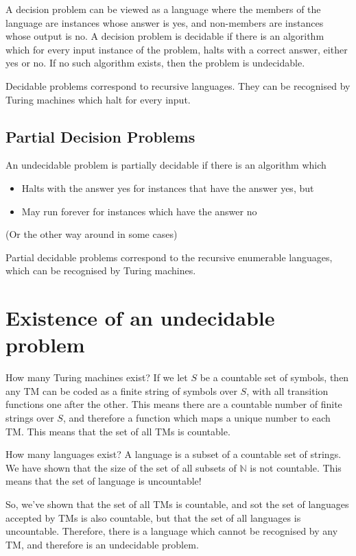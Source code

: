 A decision problem can be viewed as a language where the members of the language are instances whose answer is yes, and
 non-members are instances whose output is no. A decision problem is decidable if there is an algorithm which for every
 input instance of the problem, halts with a correct answer, either yes or no. If no such algorithm exists, then the
 problem is undecidable.

Decidable problems correspond to recursive languages. They can be recognised by Turing machines which halt for every
 input.

\subsection*{Partial Decision Problems}

\begin{definition*}{}{}
  An undecidable problem is partially decidable if there is an algorithm which
  \begin{itemize}
    \item Halts with the answer yes for instances that have the answer yes, but
    \item May run forever for instances which have the answer no
  \end{itemize}
  (Or the other way around in some cases)
\end{definition*}

Partial decidable problems correspond to the recursive enumerable languages, which can be recognised by Turing machines.

\section*{Existence of an undecidable problem}

How many Turing machines exist? If we let $S$ be a countable set of symbols, then any TM can be coded as a finite string
 of symbols over $S$, with all transition functions one after the other. This means there are a countable number of
 finite strings over $S$, and therefore a function which maps a unique number to each TM. This means that the set of all
 TMs is countable.

How many languages exist? A language is a subset of a countable set of strings. We have shown that the size of the set
 of all subsets of $\mathbb{N}$ is not countable. This means that the set of language is uncountable!

So, we've shown that the set of all TMs is countable, and sot the set of languages accepted by TMs is also countable,
 but that the set of all languages is uncountable. Therefore, there is a language which cannot be recognised by any
 TM, and therefore is an undecidable problem.

